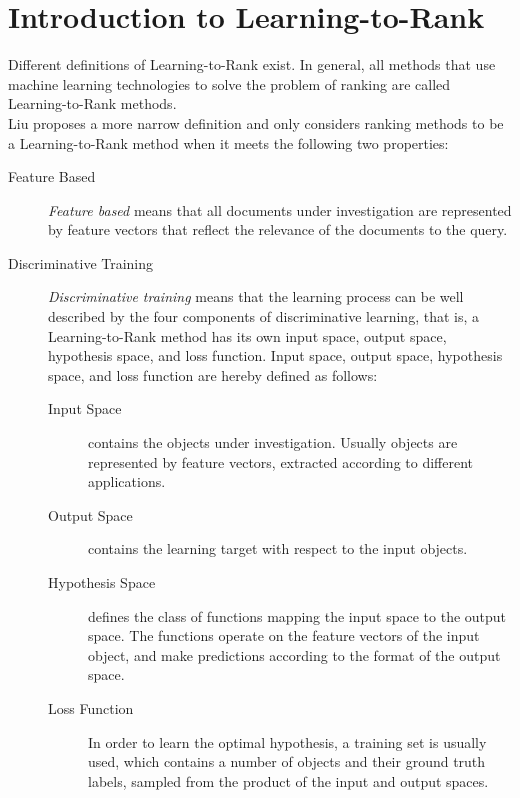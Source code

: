 \chapter{Introduction to Learning-to-Rank}
Different definitions of Learning-to-Rank exist. In general, all methods that use machine learning technologies to solve the problem of ranking are called Learning-to-Rank methods.\\
Liu \cite{Liu2007} proposes a more narrow definition and only considers ranking methods to be a Learning-to-Rank method when it meets the following two properties:
\begin{description}
\item[Feature Based]{\emph{Feature based} means that all documents under investigation are represented by feature vectors that reflect the relevance of the documents to the query.}
\item[Discriminative Training]{\emph{Discriminative training} means that the learning process can be well described by the four components of discriminative learning, that is, a Learning-to-Rank method has its own input space, output space, hypothesis space, and loss function. Input space, output space, hypothesis space, and loss function are hereby defined as follows:
	\begin{description}
	\item[Input Space]{contains the objects under investigation. Usually objects are represented by feature vectors, extracted according to different applications.}
	\item[Output Space]{contains the learning target with respect to the input objects.}
	\item[Hypothesis Space]{defines the class of functions mapping the input space to the output space. The functions operate on the feature vectors of the input object, and make predictions according to the format of the output space.}
	\item[Loss Function]{In order to learn the optimal hypothesis, a training set is usually used, which contains a number of objects and their ground truth labels, sampled from the product of the input and output spaces.}
	\end{description}
	}
\end{description}
